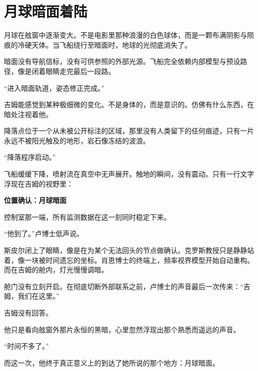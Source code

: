 \chapter{月球暗面着陆}

月球在舷窗中逐渐变大。不是电影里那种浪漫的白色球体，而是一颗布满阴影与陨痕的冷硬天体。当飞船绕行至暗面时，地球的光彻底消失了。

暗面没有导航信标，没有可供参照的外部光源。飞船完全依赖内部模型与预设路径，像是闭着眼睛走完最后一段路。

“进入暗面轨道，姿态修正完成。”

吉姆能感觉到某种极细微的变化。不是身体的，而是意识的。仿佛有什么东西，在暗处注视着他。

降落点位于一个从未被公开标注的区域，那里没有人类留下的任何痕迹，只有一片永远不被阳光触及的地形，岩石像冻结的波浪。

“降落程序启动。”

飞船缓缓下降，喷射流在真空中无声展开。触地的瞬间，没有震动。只有一行文字浮现在吉姆的视野里：

\begin{center}
\textbf{位置确认：月球暗面 }
\end{center}

控制室那一端，所有监测数据在这一刻同时稳定下来。

“他到了。”卢博士低声说。

斯皮尔闭上了眼睛，像是在为某个无法回头的节点做确认。克罗斯教授只是静静站着，像一块被时间遗忘的坐标。肖恩博士的终端上，频率视界模型开始自动重构。而在吉姆的舱内，灯光慢慢调暗。

舱门没有立刻开启。在彻底切断外部联系之前，卢博士的声音最后一次传来：“吉姆，我们在这里。”

吉姆没有回答。

他只是看向舷窗外那片永恒的黑暗，心里忽然浮现出那个熟悉而遥远的声音。

“时间不多了。”

而这一次，他终于真正意义上的到达了她所说的那个地方：月球暗面。
